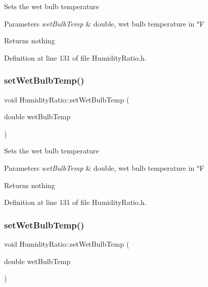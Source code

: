 Sets the wet bulb temperature


\begin{DoxyParams}{Parameters}
{\em wet\+Bulb\+Temp} & double, wet bulb temperature in °F\\
\hline
\end{DoxyParams}
\begin{DoxyReturn}{Returns}
nothing 
\end{DoxyReturn}


Definition at line 131 of file Humidity\+Ratio.\+h.

\mbox{\label{class_humidity_ratio_a5bda925f783cb4cef848245b00e28e29}} 
\subsubsection{\texorpdfstring{set\+Wet\+Bulb\+Temp()}{setWetBulbTemp()}\hspace{0.1cm}{\footnotesize\ttfamily [2/3]}}
{\footnotesize\ttfamily void Humidity\+Ratio\+::set\+Wet\+Bulb\+Temp (\begin{DoxyParamCaption}\item[{double}]{wet\+Bulb\+Temp }\end{DoxyParamCaption})\hspace{0.3cm}{\ttfamily [inline]}}

Sets the wet bulb temperature


\begin{DoxyParams}{Parameters}
{\em wet\+Bulb\+Temp} & double, wet bulb temperature in °F\\
\hline
\end{DoxyParams}
\begin{DoxyReturn}{Returns}
nothing 
\end{DoxyReturn}


Definition at line 131 of file Humidity\+Ratio.\+h.

\mbox{\label{class_humidity_ratio_a5bda925f783cb4cef848245b00e28e29}} 
\subsubsection{\texorpdfstring{set\+Wet\+Bulb\+Temp()}{setWetBulbTemp()}\hspace{0.1cm}{\footnotesize\ttfamily [3/3]}}
{\footnotesize\ttfamily void Humidity\+Ratio\+::set\+Wet\+Bulb\+Temp (\begin{DoxyParamCaption}\item[{double}]{wet\+Bulb\+Temp }\end{DoxyParamCaption})\hspace{0.3cm}{\ttfamily [inline]}}


